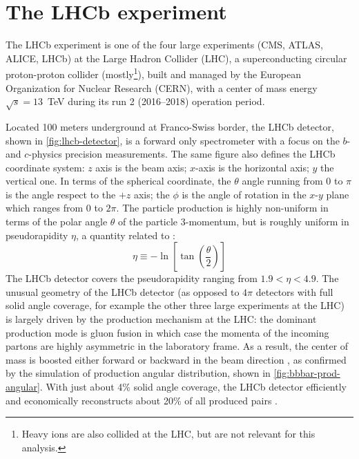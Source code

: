 \chapter{The LHCb experiment}
\label{ref:detector}

The LHCb experiment is one of the four large experiments (CMS, ATLAS, ALICE,
LHCb) at the Large Hadron Collider (LHC),
a superconducting circular proton-proton collider (mostly\footnote{
    Heavy ions are also collided at the LHC,
    but are not relevant for this analysis.
}), built and managed by
the European Organization for Nuclear Research (CERN),
with a center of mass energy
$\sqrt{s} = 13$~TeV during its run 2 (2016--2018) operation period.

Located 100 meters underground at Franco-Swiss border,
the LHCb detector,
shown in \cref{fig:lhcb-detector},
is a forward only spectrometer
with a focus on the $b$- and $c$-physics precision measurements.
The same figure also defines the LHCb coordinate system:
$z$ axis is the beam axis; $x$-axis is the horizontal axis; $y$ the vertical
one.
In terms of the spherical coordinate,
the $\theta$ angle running from 0 to $\pi$ is the angle respect to the
$+z$ axis;
the $\phi$ is the angle of rotation in the $x$-$y$ plane
which ranges from 0 to $2\pi$.
The particle production is highly non-uniform in terms of the polar angle
$\theta$ of the particle 3-momentum,
but is roughly uniform in pseudorapidity $\eta$, a quantity related to \theta:
\begin{equation}
    \eta \equiv -\ln\left[\tan\left(\frac{\theta}{2}\right)\right]
\end{equation}
The LHCb detector covers the pseudorapidity
ranging from $1.9 < \eta < 4.9$.
The unusual geometry of the LHCb detector
(as opposed to $4\pi$ detectors with full solid angle coverage,
for example the other three large experiments at the LHC)
is largely driven by the \bbbar production mechanism at the LHC:
the dominant production mode is gluon fusion in which case the momenta of the
incoming partons are highly asymmetric in the laboratory frame.
As a result, the \bbbar center of mass is boosted either forward or backward
in the beam direction \cite{Altarelli_2008},
as confirmed by the simulation of \bbbar production angular distribution,
shown in \cref{fig:bbbar-prod-angular}.
With just about 4\% solid angle coverage,
the LHCb detector efficiently and economically reconstructs about 20\%
of all produced \bbbar pairs \cite{Belyaev_2021}.

